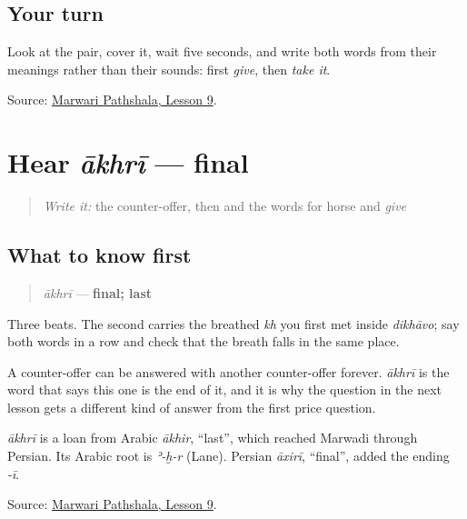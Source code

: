 \subsection*{Your turn}
Look at the pair, cover it, wait five seconds, and write both words from their meanings rather than their sounds: first \emph{give}, then \emph{take it}.

\begin{tcolorbox}[breakable,colback=teal!4,colframe=teal!35!black,title={Before you move on}]
Source: \href{https://www.marwaripathshala.com/marwari-lesson-9-english}{Marwari Pathshala, Lesson 9}.
\end{tcolorbox}
\section[ākhrī]{Hear \emph{ākhrī} — final}

\label{lesson:MW-C24-hear-aakhri}



\begin{quote}
\emph{Write it:} the counter-offer, then \textbf{} and the words for horse and \emph{give}
\end{quote}

\subsection*{What to know first}
\begin{quote}
\emph{ākhrī} — \textbf{final; last}
\end{quote}

Three beats. The second carries the breathed \emph{kh} you first met inside \emph{dikhāvo}; say both words in a row and check that the breath falls in the same place.

A counter-offer can be answered with another counter-offer forever. \emph{ākhrī} is the word that says this one is the end of it, and it is why the question in the next lesson gets a different kind of answer from the first price question.

\begin{cousinweb}
\emph{ākhrī} is a loan from Arabic \emph{ākhir}, \textquotedblleft{}last\textquotedblright{}, which reached Marwadi through Persian. Its Arabic root is \emph{ʾ-ḫ-r} (Lane). Persian \emph{āxirī}, \textquotedblleft{}final\textquotedblright{}, added the ending \emph{-ī}.
\end{cousinweb}

\begin{tcolorbox}[breakable,colback=teal!4,colframe=teal!35!black,title={Before you move on}]
Source: \href{https://www.marwaripathshala.com/marwari-lesson-9-english}{Marwari Pathshala, Lesson 9}.
\end{tcolorbox}
